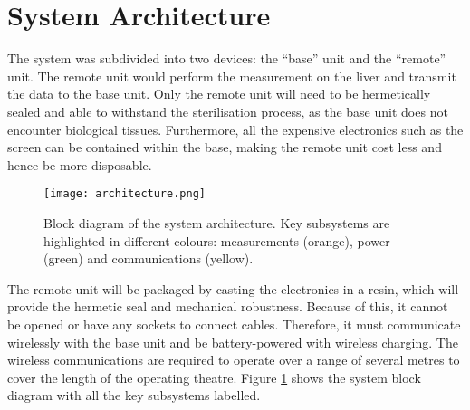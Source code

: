 \section{System Architecture}

The system was subdivided into two devices: the ``base'' unit and the ``remote'' unit. The remote unit would perform the measurement on the liver and transmit the data to the base unit. Only the remote unit will need to be hermetically sealed and able to withstand the sterilisation process, as the base unit does not encounter biological tissues. Furthermore, all the expensive electronics such as the screen can be contained within the base, making the remote unit cost less and hence be more disposable.\\

\begin{figure}[htb]
	\centering
	\texttt{[image: architecture.png]}
	\caption{Block diagram of the system architecture. Key subsystems are highlighted in different colours: measurements (orange), power (green) and communications (yellow).}
	\label{fig: architecture}
\end{figure}

The remote unit will be packaged by casting the electronics in a resin, which will provide the hermetic seal and mechanical robustness. Because of this, it cannot be opened or have any sockets to connect cables. Therefore, it must communicate wirelessly with the base unit and be battery-powered with wireless charging. The wireless communications are required to operate over a range of several metres to cover the length of the operating theatre. Figure \ref{fig: architecture} shows the system block diagram with all the key subsystems labelled.